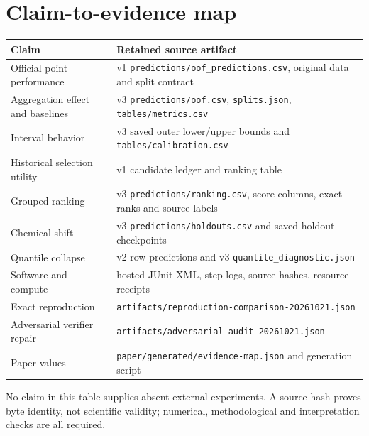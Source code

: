 \documentclass[11pt]{article}
\begin{document}
\section{Claim-to-evidence map}
\begin{center}\small
\begin{tabular}{p{.28\linewidth}p{.62\linewidth}}\toprule
Claim & Retained source artifact \\\midrule
Official point performance & v1 \texttt{predictions/oof\_predictions.csv}, original data and split contract \\
Aggregation effect and baselines & v3 \texttt{predictions/oof.csv}, \texttt{splits.json}, \texttt{tables/metrics.csv} \\
Interval behavior & v3 saved outer lower/upper bounds and \texttt{tables/calibration.csv} \\
Historical selection utility & v1 candidate ledger and ranking table \\
Grouped ranking & v3 \texttt{predictions/ranking.csv}, score columns, exact ranks and source labels \\
Chemical shift & v3 \texttt{predictions/holdouts.csv} and saved holdout checkpoints \\
Quantile collapse & v2 row predictions and v3 \texttt{quantile\_diagnostic.json} \\
Software and compute & hosted JUnit XML, step logs, source hashes, resource receipts \\
Exact reproduction & \texttt{artifacts/reproduction-comparison-20261021.json} \\
Adversarial verifier repair & \texttt{artifacts/adversarial-audit-20261021.json} \\
Paper values & \texttt{paper/generated/evidence-map.json} and generation script \\\bottomrule
\end{tabular}
\end{center}
No claim in this table supplies absent external experiments. A source hash proves byte identity, not scientific validity; numerical, methodological and interpretation checks are all required.

\clearpage


\end{document}
